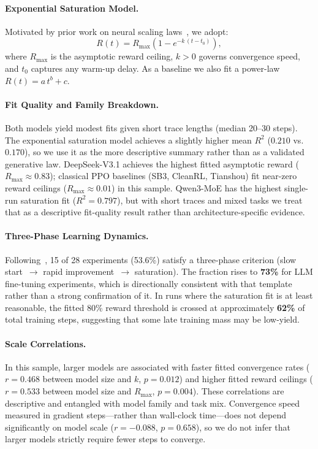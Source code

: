 \documentclass{article}
\begin{document}
\paragraph{Exponential Saturation Model.}
Motivated by prior work on neural scaling laws~\cite{nimmaturi2025scalinglaws}, we adopt:
\begin{equation}
  \label{eq:exp_sat}
  R(t) = R_{\max}\!\left(1 - e^{-k\,(t - t_0)}\right),
\end{equation}
where $R_{\max}$ is the asymptotic reward ceiling, $k > 0$ governs convergence speed,
and $t_0$ captures any warm-up delay.
As a baseline we also fit a power-law $R(t) = a\,t^{b} + c$.

\paragraph{Fit Quality and Family Breakdown.}
Both models yield modest fits given short trace lengths (median 20--30 steps).
The exponential saturation model achieves a slightly higher mean $R^{2}$
($0.210$ vs.\ $0.170$), so we use it as the more descriptive summary rather
than as a validated generative law. DeepSeek-V3.1 achieves the highest fitted
asymptotic reward ($R_{\max} \approx 0.83$); classical PPO baselines (SB3,
CleanRL, Tianshou) fit near-zero reward ceilings ($R_{\max} \approx 0.01$) in
this sample. Qwen3-MoE has the highest single-run saturation fit
($R^{2} = 0.797$), but with short traces and mixed tasks we treat that as a
descriptive fit-quality result rather than architecture-specific evidence.

\paragraph{Three-Phase Learning Dynamics.}
Following~\citet{nimmaturi2025scalinglaws}, 15 of 28 experiments (53.6\%)
satisfy a three-phase criterion (slow start~$\to$ rapid improvement~$\to$
saturation). The fraction rises to \textbf{73\%} for LLM fine-tuning
experiments, which is directionally consistent with that template rather than
a strong confirmation of it. In runs where the saturation fit is at least
reasonable, the fitted 80\% reward threshold is crossed at approximately
\textbf{62\%} of total training steps, suggesting that some late training mass
may be low-yield.

\paragraph{Scale Correlations.}
In this sample, larger models are associated with faster fitted convergence
rates ($r = 0.468$ between model size and $k$, $p = 0.012$) and higher fitted
reward ceilings ($r = 0.533$ between model size and $R_{\max}$, $p = 0.004$).
These correlations are descriptive and entangled with model family and task
mix. Convergence speed measured in gradient steps---rather than wall-clock
time---does not depend significantly on model scale ($r = -0.088$, $p =
0.658$), so we do not infer that larger models strictly require fewer steps to
converge.
\end{document}

